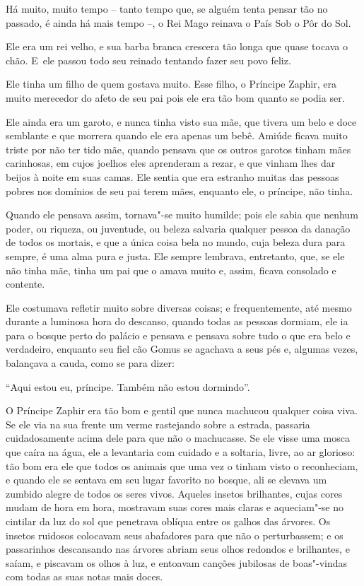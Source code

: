  

Há muito, muito tempo -- tanto tempo que, se alguém tenta pensar tão no
passado, é ainda há mais tempo --, o Rei Mago reinava o País Sob o Pôr
do Sol.

Ele era um rei velho, e sua barba branca crescera tão longa que quase
tocava o chão. E~ele passou todo seu reinado tentando fazer seu povo
feliz.

Ele tinha um filho de quem gostava muito. Esse filho, o Príncipe Zaphir,
era muito merecedor do afeto de seu pai pois ele era tão bom quanto se
podia ser.

Ele ainda era um garoto, e nunca tinha visto sua mãe, que tivera um belo
e doce semblante e que morrera quando ele era apenas um bebê. Amiúde
ficava muito triste por não ter tido mãe, quando pensava que os outros
garotos tinham mães carinhosas, em cujos joelhos eles aprenderam a
rezar, e que vinham lhes dar beijos à noite em suas camas. Ele sentia
que era estranho muitas das pessoas pobres nos domínios de seu pai terem
mães, enquanto ele, o príncipe, não tinha.


Quando ele pensava assim, tornava"-se muito humilde; pois ele sabia que
nenhum poder, ou riqueza, ou juventude, ou beleza salvaria qualquer
pessoa da danação de todos os mortais, e que a única coisa bela no
mundo, cuja beleza dura para sempre, é uma alma pura e justa. Ele sempre
lembrava, entretanto, que, se ele não tinha mãe, tinha um pai que o
amava muito e, assim, ficava consolado e contente.

Ele costumava refletir muito sobre diversas coisas; e frequentemente,
até mesmo durante a luminosa hora do descanso, quando todas as pessoas
dormiam, ele ia para o bosque perto do palácio e pensava e pensava sobre
tudo o que era belo e verdadeiro, enquanto seu fiel cão Gomus se
agachava a seus pés e, algumas vezes, balançava a cauda, como se para
dizer:

``Aqui estou eu, príncipe. Também não estou dormindo''.

O Príncipe Zaphir era tão bom e gentil que nunca machucou qualquer coisa
viva. Se ele via na sua frente um verme rastejando sobre a estrada,
passaria cuidadosamente acima dele para que não o machucasse. Se ele
visse uma mosca que caíra na água, ele a levantaria com cuidado e a
soltaria, livre, ao ar glorioso: tão bom era ele que todos os animais
que uma vez o tinham visto o reconheciam, e quando ele se sentava em seu
lugar favorito no bosque, ali se elevava um zumbido alegre de todos os
seres vivos. Aqueles insetos brilhantes, cujas cores mudam de hora em
hora, mostravam suas cores mais claras e aqueciam"-se no cintilar da luz
do sol que penetrava oblíqua entre os galhos das árvores. Os insetos
ruidosos colocavam seus abafadores para que não o perturbassem; e os
passarinhos descansando nas árvores abriam seus olhos redondos e
brilhantes, e saíam, e piscavam os olhos à luz, e entoavam canções
jubilosas de boas"-vindas com todas as suas notas mais doces.

